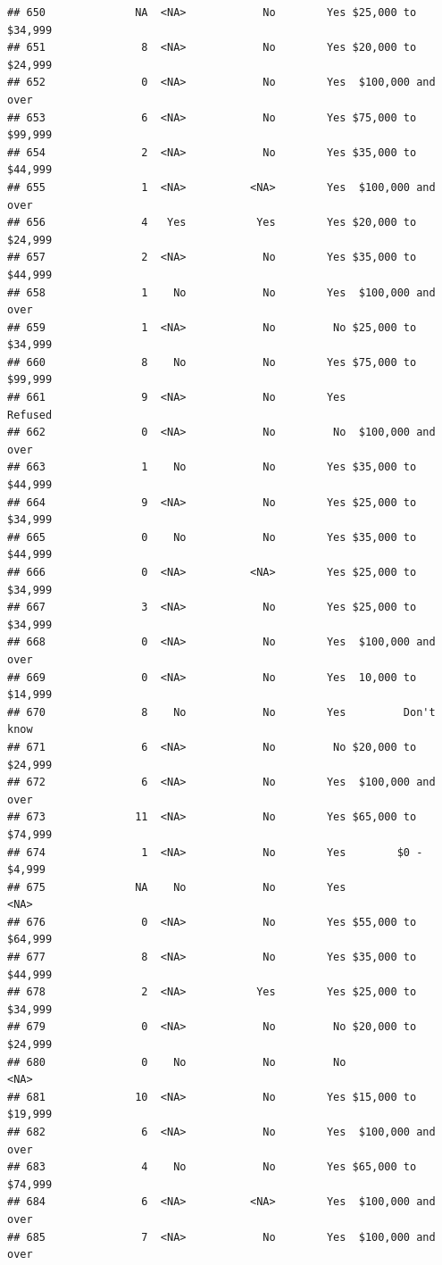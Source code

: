 \documentclass[man]{apa6}
\begin{document}
\begin{verbatim}
## 650              NA  <NA>            No        Yes $25,000 to $34,999
## 651               8  <NA>            No        Yes $20,000 to $24,999
## 652               0  <NA>            No        Yes  $100,000 and over
## 653               6  <NA>            No        Yes $75,000 to $99,999
## 654               2  <NA>            No        Yes $35,000 to $44,999
## 655               1  <NA>          <NA>        Yes  $100,000 and over
## 656               4   Yes           Yes        Yes $20,000 to $24,999
## 657               2  <NA>            No        Yes $35,000 to $44,999
## 658               1    No            No        Yes  $100,000 and over
## 659               1  <NA>            No         No $25,000 to $34,999
## 660               8    No            No        Yes $75,000 to $99,999
## 661               9  <NA>            No        Yes            Refused
## 662               0  <NA>            No         No  $100,000 and over
## 663               1    No            No        Yes $35,000 to $44,999
## 664               9  <NA>            No        Yes $25,000 to $34,999
## 665               0    No            No        Yes $35,000 to $44,999
## 666               0  <NA>          <NA>        Yes $25,000 to $34,999
## 667               3  <NA>            No        Yes $25,000 to $34,999
## 668               0  <NA>            No        Yes  $100,000 and over
## 669               0  <NA>            No        Yes  10,000 to $14,999
## 670               8    No            No        Yes         Don't know
## 671               6  <NA>            No         No $20,000 to $24,999
## 672               6  <NA>            No        Yes  $100,000 and over
## 673              11  <NA>            No        Yes $65,000 to $74,999
## 674               1  <NA>            No        Yes        $0 - $4,999
## 675              NA    No            No        Yes               <NA>
## 676               0  <NA>            No        Yes $55,000 to $64,999
## 677               8  <NA>            No        Yes $35,000 to $44,999
## 678               2  <NA>           Yes        Yes $25,000 to $34,999
## 679               0  <NA>            No         No $20,000 to $24,999
## 680               0    No            No         No               <NA>
## 681              10  <NA>            No        Yes $15,000 to $19,999
## 682               6  <NA>            No        Yes  $100,000 and over
## 683               4    No            No        Yes $65,000 to $74,999
## 684               6  <NA>          <NA>        Yes  $100,000 and over
## 685               7  <NA>            No        Yes  $100,000 and over

\end{verbatim}
\end{document}
